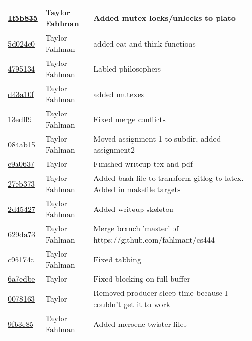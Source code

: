\begin{tabular}{l l l}
\href{git@github.com:fahlmant/cs444/commit/1f5b835fc8b41d44ee33a2f2e6f5ec916591957a}{1f5b835} & Taylor Fahlman & Added mutex locks/unlocks to plato\\\hline
\href{git@github.com:fahlmant/cs444/commit/5d024e0d8a49d0db3b239929402e049376df57e1}{5d024e0} & Taylor Fahlman & added eat and think functions\\\hline
\href{git@github.com:fahlmant/cs444/commit/4795134ae4187793f395617ba52841d7c9e7f6d1}{4795134} & Taylor Fahlman & Labled philosophers\\\hline
\href{git@github.com:fahlmant/cs444/commit/d43a10f1ac0ff2b53122ca42969b95d5e5b474b9}{d43a10f} & Taylor Fahlman & added mutexes\\\hline
\href{git@github.com:fahlmant/cs444/commit/13edff973f75105ee082af2453bb0ea1789c6823}{13edff9} & Taylor Fahlman & Fixed merge conflicts\\\hline
\href{git@github.com:fahlmant/cs444/commit/084ab1563492ad141bbbf835df613426e6070df2}{084ab15} & Taylor Fahlman & Moved assignment 1 to subdir, added assignment2\\\hline
\href{git@github.com:fahlmant/cs444/commit/e9a06375c5e5ee5232d5a3a71fa1dd1ac336b7cc}{e9a0637} & Taylor & Finished writeup tex and pdf\\\hline
\href{git@github.com:fahlmant/cs444/commit/27eb37349447092eec979e1d09531408f38ac661}{27eb373} & Taylor Fahlman & Added bash file to transform gitlog to latex. Added in makefile targets\\\hline
\href{git@github.com:fahlmant/cs444/commit/2d454270c6b79091f4c1363da7185e3ffbcb2301}{2d45427} & Taylor Fahlman & Added writeup skeleton\\\hline
\href{git@github.com:fahlmant/cs444/commit/629da73d1a287be9db4919d9bc27c987acfb7128}{629da73} & Taylor Fahlman & Merge branch 'master' of https://github.com/fahlmant/cs444\\\hline
\href{git@github.com:fahlmant/cs444/commit/c96174c136e9194fd83f4d5fee5927432468fdfd}{c96174c} & Taylor Fahlman & Fixed tabbing\\\hline
\href{git@github.com:fahlmant/cs444/commit/6a7edbe421fb5e53a9a847a09117500c1ca1482e}{6a7edbe} & Taylor & Fixed blocking on full buffer\\\hline
\href{git@github.com:fahlmant/cs444/commit/007816390983ac7d562e8f9d4d31ff6abc7c40c8}{0078163} & Taylor & Removed producer sleep time because I couldn't get it to work\\\hline
\href{git@github.com:fahlmant/cs444/commit/9fb3e850a20f58cd174a80bf580c150ebb8a8860}{9fb3e85} & Taylor Fahlman & Added mersene twister files\\\hline

\end{tabular}
